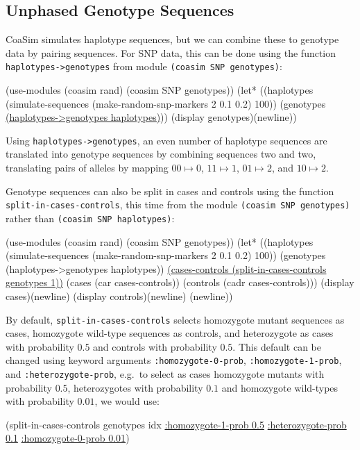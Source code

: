 \documentclass{manual}
\begin{document}
\subsection{Unphased Genotype Sequences}
\label{sec:unph-genotype-sequ}

CoaSim simulates haplotype sequences, but we can combine these to
genotype data by pairing sequences.  For SNP data, this can be done
using the function \texttt{haplotypes->genotypes} from module
\texttt{(coasim SNP genotypes)}:
\begin{code}
(use-modules (coasim rand) (coasim SNP genotypes))
(let* ((haplotypes
          (simulate-sequences (make-random-snp-markers 2 0.1 0.2) 100))
       (genotypes \underline{(haplotypes->genotypes haplotypes)}))
  (display genotypes)(newline))
\end{code}

Using \texttt{haplotypes->genotypes}, an even number of haplotype
sequences are translated into genotype sequences by combining
sequences two and two, translating pairs of alleles by mapping
$00\mapsto 0$, $11\mapsto 1$, $01\mapsto 2$, and $10\mapsto 2$.

Genotype sequences can also be split in cases and controls using the
function \texttt{split-in-cases-controls}, this time from the module
\texttt{(coasim SNP genotypes)} rather than \texttt{(coasim SNP haplotypes)}:
\begin{code}
(use-modules (coasim rand) (coasim SNP genotypes))
(let* ((haplotypes
          (simulate-sequences (make-random-snp-markers 2 0.1 0.2) 100))
       (genotypes (haplotypes->genotypes haplotypes))
       \underline{(cases-controls (split-in-cases-controls genotypes 1))}
       (cases (car cases-controls))
       (controls (cadr cases-controls)))
  (display cases)(newline)
  (display controls)(newline)
  (newline))
\end{code}

By default, \texttt{split-in-cases-controls} selects homozygote
mutant sequences as cases, homozygote wild-type sequences as controls,
and heterozygote as cases with probability $0.5$ and controls with
probability $0.5$.  This default can be changed using keyword
arguments \texttt{:homozygote-0-prob}, \texttt{:homozygote-1-prob},
and \texttt{:heterozygote-prob}, e.g.\ to select as cases homozygote
mutants with probability $0.5$, heterozygotes with probability $0.1$
and homozygote wild-types with probability $0.01$, we would use:
\begin{code}
(split-in-cases-controls genotypes idx \underline{:homozygote-1-prob 0.5}
                                       \underline{:heterozygote-prob 0.1}
                                       \underline{:homozygote-0-prob 0.01})
\end{code}
\end{document}
